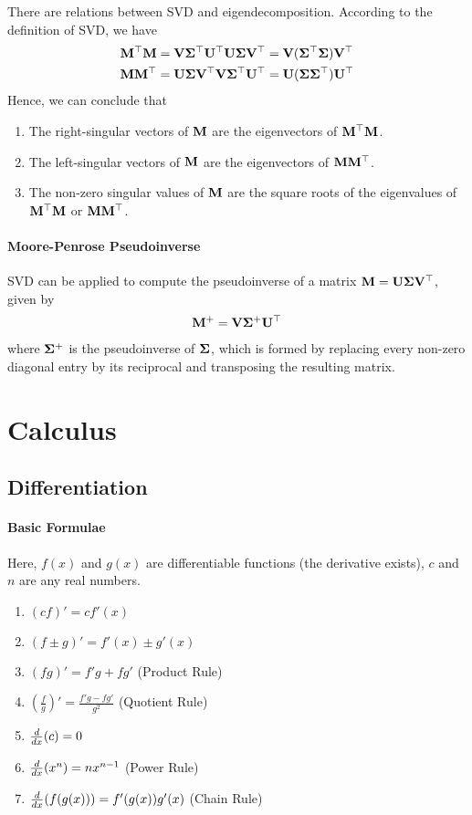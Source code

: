 There are relations between SVD and eigendecomposition. According to the definition of SVD, we have
\begin{align*}
	\mathbf{M}{}^\top\mathbf{M}&=\mathbf{V}\mathbf{\Sigma}{}^\top\mathbf{U}{}^\top\mathbf{U}\mathbf{\Sigma}\mathbf{V}{}^\top=\mathbf{V}(\mathbf{\Sigma}{}^\top\mathbf{\Sigma})\mathbf{V}{}^\top \\
	\mathbf{M}\mathbf{M}{}^\top&=\mathbf{U}\mathbf{\Sigma}\mathbf{V}{}^\top\mathbf{V}\mathbf{\Sigma}{}^\top\mathbf{U}{}^\top=\mathbf{U}(\mathbf{\Sigma}\mathbf{\Sigma}{}^\top)\mathbf{U}{}^\top
\end{align*}
Hence, we can conclude that
\begin{enumerate}
	\item The right-singular vectors of $\mathbf{M}$ are the eigenvectors of $\mathbf{M}{}^\top\mathbf{M}$.
	\item The left-singular vectors of $\mathbf{M}$ are the eigenvectors of $\mathbf{M}\mathbf{M}{}^\top$.
	\item The non-zero singular values of $\mathbf{M}$ are the square roots of the eigenvalues of $\mathbf{M}{}^\top\mathbf{M}$ or $\mathbf{M}\mathbf{M}{}^\top$.
\end{enumerate}

\paragraph{Moore-Penrose Pseudoinverse}

SVD can be applied to compute the pseudoinverse of a matrix $\mathbf{M}=\mathbf{U}\mathbf{\Sigma}\mathbf{V}{}^\top$, given by
\begin{align*}
	\mathbf{M}^+=\mathbf{V}\mathbf{\Sigma}^+\mathbf{U}{}^\top
\end{align*}
where $\mathbf{\Sigma}^+$ is the pseudoinverse of $\mathbf{\Sigma}$, which is formed by replacing every non-zero diagonal entry by its reciprocal and transposing the resulting matrix.



\section{Calculus}
\label{section2.3}

\subsection{Differentiation}

\paragraph{Basic Formulae}

Here, $f(x)$ and $g(x)$ are differentiable functions (the derivative exists), $c$ and $n$ are any real numbers.
\begin{enumerate}
	\item $(cf)'=cf'(x)$
	\item $(f\pm g)'=f'(x)\pm g'(x)$
	\item $(fg)'=f'g+fg'$ (Product Rule)
	\item $(\frac{f}{g})'=\frac{f'g-fg'}{g^2}$ (Quotient Rule)
	\item $\frac{d}{dx}(c)=0$
	\item $\frac{d}{dx}(x^n)=nx^{n-1}$ (Power Rule)
	\item $\frac{d}{dx}(f(g(x)))=f'(g(x))g'(x)$ (Chain Rule)
\end{enumerate}

